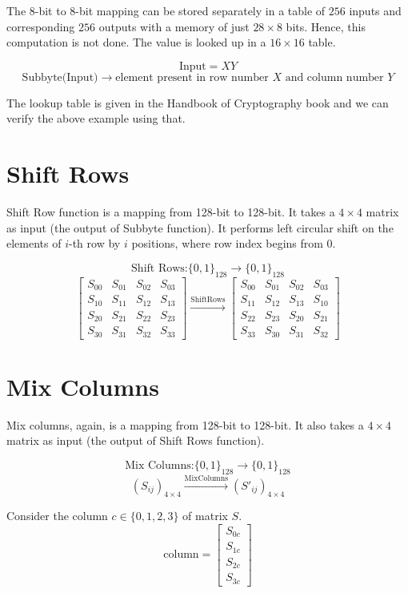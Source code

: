 \documentclass[11pt]{article}
\begin{document}
The $8$-bit to $8$-bit mapping can be stored separately in a table of $256$ inputs and corresponding $256$ outputs with a memory of just $28 \times 8$ bits. Hence, this computation is not done. The value is looked up in a $16 \times 16$ table.

\[ \text{Input} = XY \]
\[ \text{Subbyte(Input)} \rightarrow \text{element present in row number } X \text{ and column number } Y \]

The lookup table is given in the Handbook of Cryptography book and we can verify the above example using that.

\section*{Shift Rows}
Shift Row function is a mapping from 128-bit to 128-bit. It takes a $4 \times 4$ matrix as input (the output of Subbyte function). It performs left circular shift on the elements of $i$-th row by $i$ positions, where row index begins from 0.

\[ \text{Shift Rows:} \{0, 1\}_{128} \rightarrow \{0, 1\}_{128} \]
\[
\begin{bmatrix}
S_{00} & S_{01} & S_{02} & S_{03} \\
S_{10} & S_{11} & S_{12} & S_{13} \\
S_{20} & S_{21} & S_{22} & S_{23} \\
S_{30} & S_{31} & S_{32} & S_{33}
\end{bmatrix}
\xrightarrow{\text{ShiftRows}}
\begin{bmatrix}
S_{00} & S_{01} & S_{02} & S_{03} \\
S_{11} & S_{12} & S_{13} & S_{10} \\
S_{22} & S_{23} & S_{20} & S_{21} \\
S_{33} & S_{30} & S_{31} & S_{32}
\end{bmatrix}
\]

\section*{Mix Columns}
Mix columns, again, is a mapping from 128-bit to 128-bit. It also takes a $4 \times 4$ matrix as input (the output of Shift Rows function).

\[ \text{Mix Columns:} \{0, 1\}_{128} \rightarrow \{0, 1\}_{128} \]
\[ (S_{ij})_{4 \times 4} \xrightarrow{\text{MixColumns}} (S'_{ij})_{4 \times 4} \]

Consider the column $c \in \{0, 1, 2, 3\}$ of matrix $S$.
\[ \text{column} =
\begin{bmatrix}
S_{0c} \\
S_{1c} \\
S_{2c} \\
S_{3c}
\end{bmatrix}
\]
\end{document}
